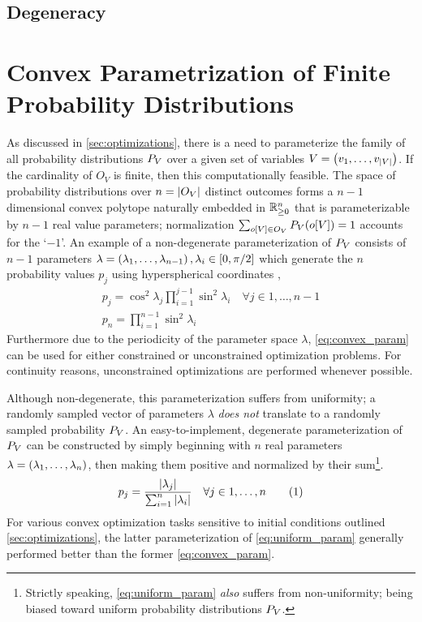 \documentclass[aps, 10pt, english, twoside, pra, nofootinbib, longbibliography]{revtex4-1}
\theoremstyle{plain}
\theoremstyle{definition}
\theoremstyle{remark}
\newcommand{\outc}[1]{o\!\bs{#1}} %
\begin{document}
    \subsection{Degeneracy}
    \section{Convex Parametrization of Finite Probability Distributions}
    As discussed in \cref{sec:optimizations}, there is a need to parameterize the family of all probability distributions $\prob[V]$ over a given set of variables $V = \left( v_1, \ldots, v_{\left| V \right|} \right)$. If the cardinality of $O_{V}$ is finite, then this computationally feasible. The space of probability distributions over $n = \left| O_{V} \right|$ distinct outcomes forms a $n-1$ dimensional convex polytope naturally embedded in ${\mathbb{R}}_{\geq 0}^n$ \cite{Brunner_2013} that is parameterizable by $n-1$ real value parameters; normalization $\sum_{o\bs{V} \in O_V} \prob[V][\outc{V}] = 1$ accounts for the `$-1$'. An example of a non-degenerate parameterization of $\prob[V]$ consists of $n-1$ parameters $\lambda = \left( \lambda_1, \ldots, \lambda_{n-1} \right), \lambda_i \in \left[ 0, \pi/2 \right]$ which generate the $n$ probability values $p_j$ using hyperspherical coordinates \cite{Hedemann_2013, Spengler_2010_Unitary},
    \begin{equation}
    \begin{gathered}
        \label{eq:convex_param}
        p_j = \cos^2 \lambda_j \prod_{i=1}^{j-1} \sin^2 \lambda_i \quad \forall j \in 1, \ldots, n - 1 \\
        p_n = \prod_{i=1}^{n-1} \sin^2 \lambda_i
    \end{gathered}
    \end{equation}
    Furthermore due to the periodicity of the parameter space $\lambda$, \cref{eq:convex_param} can be used for either constrained or unconstrained optimization problems. For continuity reasons, unconstrained optimizations are performed whenever possible.

    Although non-degenerate, this parameterization suffers from uniformity; a randomly sampled vector of parameters $\lambda$ \textit{does not} translate to a randomly sampled probability $\prob[V]$. An easy-to-implement, degenerate parameterization of $\prob[V]$ can be constructed by simply beginning with $n$ real parameters $\lambda = \left( \lambda_1, \ldots, \lambda_n \right)$, then making them positive and normalized by their sum\footnote{Strictly speaking, \cref{eq:uniform_param} \textit{also} suffers from non-uniformity; being biased toward uniform probability distributions $\prob[V]$. }.
    \[ p_j = \f{\abs{\lambda_j}}{\sum_{i=1}^{n} \abs{\lambda_i}} \quad \forall j \in 1, \ldots, n \eq \label{eq:uniform_param} \]
    For various convex optimization tasks sensitive to initial conditions outlined \cref{sec:optimizations}, the latter parameterization of \cref{eq:uniform_param} generally performed better than the former \cref{eq:convex_param}.

    
\end{document}
